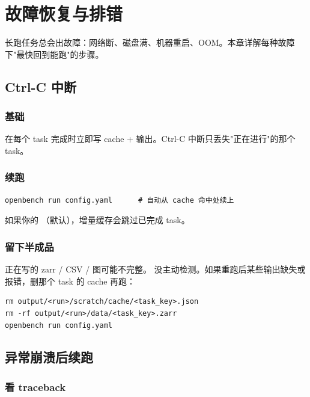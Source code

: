 
\chapter{故障恢复与排错}

长跑任务总会出故障：网络断、磁盘满、机器重启、OOM。本章详解每种故障下"最快回到能跑"的步骤。

\section{Ctrl-C 中断}

\subsection{基础}

\openbench{} 在每个 task 完成时立即写 cache + 输出。Ctrl-C 中断只丢失"正在进行"的那个 task。

\subsection{续跑}

\begin{verbatim}
openbench run config.yaml      # 自动从 cache 命中处续上
\end{verbatim}

如果你的 （默认），增量缓存会跳过已完成 task。

\subsection{留下半成品}

正在写的 zarr / CSV / 图可能不完整。\openbench{} 没主动检测。如果重跑后某些输出缺失或报错，删那个 task 的 cache 再跑：

\begin{verbatim}
rm output/<run>/scratch/cache/<task_key>.json
rm -rf output/<run>/data/<task_key>.zarr
openbench run config.yaml
\end{verbatim}

\section{异常崩溃后续跑}

\subsection{看 traceback}

